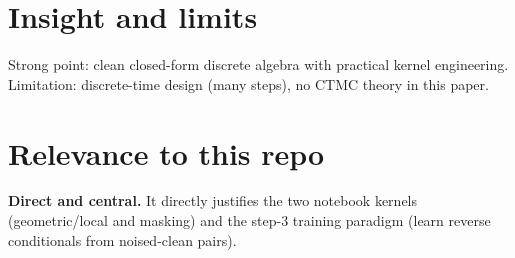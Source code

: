 \documentclass[11pt]{article}
\begin{document}
\section*{Insight and limits}
Strong point: clean closed-form discrete algebra with practical kernel engineering.
Limitation: discrete-time design (many steps), no CTMC theory in this paper.

\section*{Relevance to this repo}
\textbf{Direct and central.}
It directly justifies the two notebook kernels (geometric/local and masking) and the step-3 training paradigm (learn reverse conditionals from noised-clean pairs).
\end{document}
